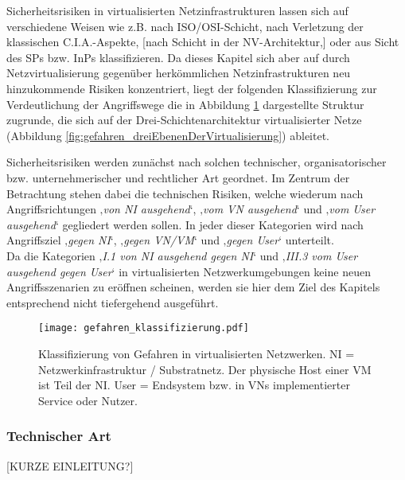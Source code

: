 Sicherheitsrisiken in virtualisierten Netzinfrastrukturen lassen sich auf verschiedene Weisen wie z.B. nach ISO/OSI-Schicht, nach Verletzung der klassischen C.I.A.-Aspekte, [nach Schicht in der NV-Architektur,] oder aus Sicht des SPs bzw. InPs klassifizieren. Da dieses Kapitel sich aber auf durch Netzvirtualisierung gegenüber herkömmlichen Netzinfrastrukturen neu hinzukommende Risiken konzentriert, liegt der folgenden Klassifizierung zur Verdeutlichung der Angriffswege die in Abbildung \ref{fig:gefahren_klassifizierung} dargestellte Struktur zugrunde, die sich auf der Drei-Schichtenarchitektur virtualisierter Netze (Abbildung \ref{fig:gefahren_dreiEbenenDerVirtualisierung}) ableitet.

Sicherheitsrisiken werden zunächst nach solchen technischer, organisatorischer bzw. unternehmerischer und rechtlicher Art geordnet. Im Zentrum der Betrachtung stehen dabei die technischen Risiken, welche wiederum nach Angriffsrichtungen ‚\textit{von NI ausgehend}‘, ‚\textit{vom VN ausgehend}‘ und ‚\textit{vom User ausgehend}‘ gegliedert werden sollen. In jeder dieser Kategorien wird nach Angriffsziel ‚\textit{gegen NI}‘, ‚\textit{gegen VN/VM}‘ und ‚\textit{gegen User}‘ unterteilt. \\
Da die Kategorien ‚\textit{I.1 von NI ausgehend gegen NI}‘ und ‚\textit{III.3 vom User ausgehend gegen User}‘ in virtualisierten Netzwerkumgebungen keine neuen Angriffsszenarien zu eröffnen scheinen, werden sie hier dem Ziel des Kapitels entsprechend nicht tiefergehend ausgeführt. 


\begin{figure}[htb]
	\begin{center}
	\texttt{[image: gefahren\_klassifizierung.pdf]}
	\caption{\label{fig:gefahren_klassifizierung} Klassifizierung von Gefahren in virtualisierten Netzwerken. 
		\newline NI = Netzwerkinfrastruktur / Substratnetz. Der physische Host einer VM ist Teil der NI.
		\newline User = Endsystem bzw. in VNs implementierter Service oder Nutzer.}
	\end{center}
\end{figure}





\subsubsection{Technischer Art}
\label{subsubsec:gefahren_virt_technisch}
[KURZE EINLEITUNG?]


